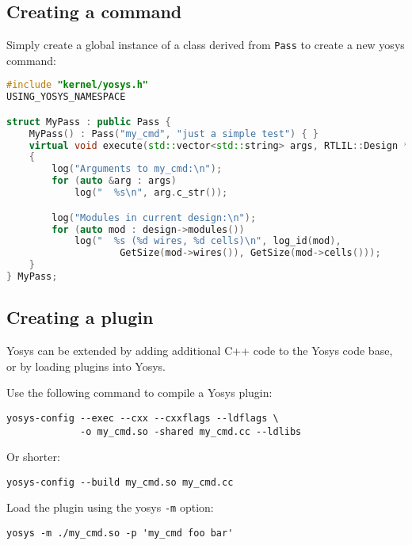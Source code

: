 
\subsection{Creating a command}

\begin{frame}[t, fragile]{\subsecname}
Simply create a global instance of a class derived from {\tt Pass} to create
a new yosys command:

\bigskip
\begin{lstlisting}[xleftmargin=1cm, basicstyle=\ttfamily\fontsize{8pt}{10pt}\selectfont, language=C++]
#include "kernel/yosys.h"
USING_YOSYS_NAMESPACE

struct MyPass : public Pass {
    MyPass() : Pass("my_cmd", "just a simple test") { }
    virtual void execute(std::vector<std::string> args, RTLIL::Design *design)
    {
        log("Arguments to my_cmd:\n");
        for (auto &arg : args)
            log("  %s\n", arg.c_str());

        log("Modules in current design:\n");
        for (auto mod : design->modules())
            log("  %s (%d wires, %d cells)\n", log_id(mod),
                    GetSize(mod->wires()), GetSize(mod->cells()));
    }
} MyPass;
\end{lstlisting}
\end{frame}


\subsection{Creating a plugin}

\begin{frame}[fragile]{\subsecname}
Yosys can be extended by adding additional C++ code to the Yosys code base, or
by loading plugins into Yosys.

\bigskip
Use the following command to compile a Yosys plugin:
\begin{lstlisting}[xleftmargin=1cm, basicstyle=\ttfamily\fontsize{8pt}{10pt}\selectfont]
yosys-config --exec --cxx --cxxflags --ldflags \
             -o my_cmd.so -shared my_cmd.cc --ldlibs
\end{lstlisting}

\bigskip
Or shorter:
\begin{lstlisting}[xleftmargin=1cm, basicstyle=\ttfamily\fontsize{8pt}{10pt}\selectfont]
yosys-config --build my_cmd.so my_cmd.cc
\end{lstlisting}

\bigskip
Load the plugin using the yosys {\tt -m} option:
\begin{lstlisting}[xleftmargin=1cm, basicstyle=\ttfamily\fontsize{8pt}{10pt}\selectfont]
yosys -m ./my_cmd.so -p 'my_cmd foo bar'
\end{lstlisting}
\end{frame}

